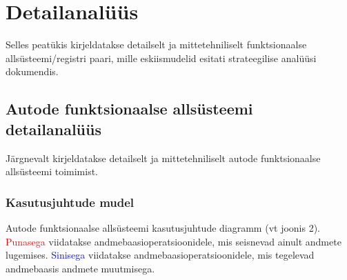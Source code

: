 \setlength{\topmargin}{-.5in}
\setlength{\textheight}{9in}
\setlength{\oddsidemargin}{.125in}
\setlength{\textwidth}{6.25in}
\captionsetup[table]{justification=justified,singlelinecheck=false,labelformat=empty,skip=0pt}
\graphicspath{ {./images/} }
\captionsetup[figure]{justification=justified,singlelinecheck=false,labelformat=empty,skip=0pt}
\newcommand{\useDash}{\renewcommand{\labelitemi}{\textendash}}

\chapter{Detailanalüüs}
Selles peatükis kirjeldatakse detailselt ja mittetehniliselt funktsionaalse allsüsteemi/registri paari, mille eskiismudelid esitati strateegilise analüüsi dokumendis.

\section{Autode funktsionaalse allsüsteemi detailanalüüs}
Järgnevalt kirjeldatakse detailselt ja mittetehniliselt autode funktsionaalse allsüsteemi toimimist.

\subsection{Kasutusjuhtude mudel}
Autode funktsionaalse allsüsteemi kasutusjuhtude diagramm (vt joonis 2).  \vspace{\pVert} \\ \hfill
\textcolor{red}{Punasega} viidatakse andmebaasioperatsioonidele, mis seisnevad ainult andmete lugemises. \textcolor{blue}{Sinisega} viidatakse andmebaasioperatsioonidele, mis tegelevad andmebaasis andmete muutmisega.

